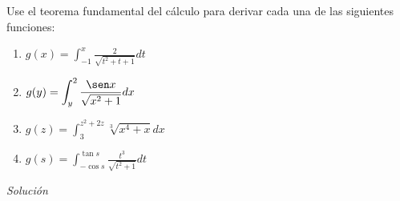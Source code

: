 \begin{ejemplo}
\textnormal{Use el teorema fundamental del cálculo para derivar cada una de las siguientes funciones:}
\end{ejemplo}

\begin{enumerate}[leftmargin=1.2em,   itemindent=0pt,       labelwidth=\labelwidth,labelsep=0.5em,]
	
\item $g(x)=\displaystyle{\int_{-1}^{x}\frac{2}{\sqrt{t^{2}+t+1}}dt}$

\item $g(y)=\displaystyle{\int_{y}^{2}\frac{\sen x}{\sqrt{x^{2}+1}}dx}$

\item $g(z)=\displaystyle{\int_{3}^{z^{2}+2z}\sqrt[3]{x^{4}+x}dx}$

\item $g(s)=\displaystyle{\int_{-\cos s}^{\tan s}\frac{t^{3}}{\sqrt{t^{2}+1}}dt}$
\end{enumerate}

\textit{Solución}


